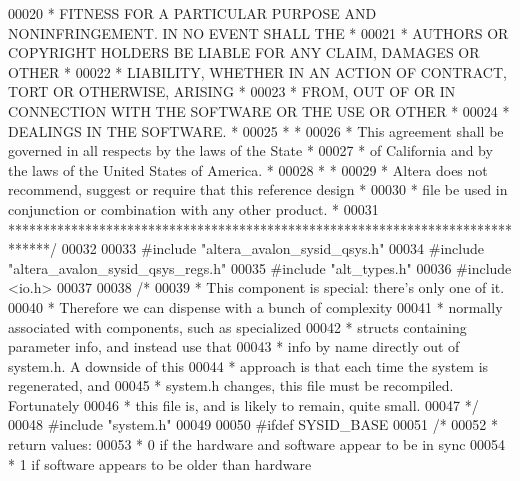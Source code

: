 \begin{DoxyCode}
00020 \textcolor{comment}{* FITNESS FOR A PARTICULAR PURPOSE AND NONINFRINGEMENT. IN NO EVENT SHALL THE *}
00021 \textcolor{comment}{* AUTHORS OR COPYRIGHT HOLDERS BE LIABLE FOR ANY CLAIM, DAMAGES OR OTHER      *}
00022 \textcolor{comment}{* LIABILITY, WHETHER IN AN ACTION OF CONTRACT, TORT OR OTHERWISE, ARISING     *}
00023 \textcolor{comment}{* FROM, OUT OF OR IN CONNECTION WITH THE SOFTWARE OR THE USE OR OTHER         *}
00024 \textcolor{comment}{* DEALINGS IN THE SOFTWARE.                                                   *}
00025 \textcolor{comment}{*                                                                             *}
00026 \textcolor{comment}{* This agreement shall be governed in all respects by the laws of the State   *}
00027 \textcolor{comment}{* of California and by the laws of the United States of America.              *}
00028 \textcolor{comment}{*                                                                             *}
00029 \textcolor{comment}{* Altera does not recommend, suggest or require that this reference design    *}
00030 \textcolor{comment}{* file be used in conjunction or combination with any other product.          *}
00031 \textcolor{comment}{******************************************************************************/}
00032 
00033 \textcolor{preprocessor}{#include "altera_avalon_sysid_qsys.h"}
00034 \textcolor{preprocessor}{#include "altera_avalon_sysid_qsys_regs.h"}
00035 \textcolor{preprocessor}{#include "alt_types.h"}
00036 \textcolor{preprocessor}{#include <io.h>}
00037 
00038 \textcolor{comment}{/*}
00039 \textcolor{comment}{*  This component is special: there's only one of it.}
00040 \textcolor{comment}{*  Therefore we can dispense with a bunch of complexity}
00041 \textcolor{comment}{*  normally associated with components, such as specialized}
00042 \textcolor{comment}{*  structs containing parameter info, and instead use that}
00043 \textcolor{comment}{*  info by name directly out of system.h.  A downside of this}
00044 \textcolor{comment}{*  approach is that each time the system is regenerated, and}
00045 \textcolor{comment}{*  system.h changes, this file must be recompiled.  Fortunately}
00046 \textcolor{comment}{*  this file is, and is likely to remain, quite small.}
00047 \textcolor{comment}{*/}
00048 \textcolor{preprocessor}{#include "system.h"}
00049 
00050 \textcolor{preprocessor}{#ifdef SYSID\_BASE}
00051 \textcolor{comment}{/*}
00052 \textcolor{comment}{*  return values:}
00053 \textcolor{comment}{*    0 if the hardware and software appear to be in sync}
00054 \textcolor{comment}{*    1 if software appears to be older than hardware}

\end{DoxyCode}
